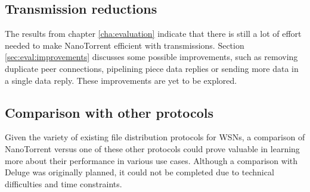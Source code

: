 \subsection{Transmission reductions}
The results from chapter \ref{cha:evaluation} indicate that there is still a lot of effort needed to make NanoTorrent efficient with transmissions. Section \ref{sec:eval:improvements} discusses some possible improvements, such as removing duplicate peer connections, pipelining piece data replies or sending more data in a single data reply. These improvements are yet to be explored.

\subsection{Comparison with other protocols}
Given the variety of existing file distribution protocols for \glspl{WSN}, a comparison of NanoTorrent versus one of these other protocols could prove valuable in learning more about their performance in various use cases. Although a comparison with Deluge \cite{deluge} was originally planned, it could not be completed due to technical difficulties and time constraints.
